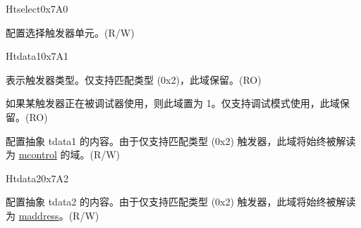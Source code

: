 \begin{register}{H}{tselect}{0x7A0}\label{regdesc:LPTSELECT}
%
\regnewline%
\begin{regdesc}\begin{reglist}
\label{fielddesc:LPTSELECT}\item [tselect] 配置选择触发器单元。(R/W)
\end{reglist}\end{regdesc}
\end{register}

\begin{register}{H}{tdata1}{0x7A1}\label{regdesc:LPTDATA1}
%
%
%
\regnewline%
\begin{regdesc}\begin{reglist}
\label{fielddesc:LPTDATA1TYPE}\item [type] 表示触发器类型。仅支持匹配类型 (0x2)，此域保留。(RO)
\label{fielddesc:LPTDATA1DMODE}\item [dmode] 如果某触发器正在被调试器使用，则此域置为 1。仅支持调试模式使用，此域保留。(RO)
\label{fielddesc:LPTDATA1DATA}\item [data] 配置抽象 tdata1 的内容。由于仅支持匹配类型 (0x2) 触发器，此域将始终被解读为 \hyperref[regdesc:LPMCONTROL]{mcontrol} 的域。(R/W)
\end{reglist}\end{regdesc}
\end{register}


\begin{register}{H}{tdata2}{0x7A2}\label{regdesc:LPTDATA2}
%
\regnewline%
\begin{regdesc}\begin{reglist}
\label{fielddesc:LPTDATA2}\item [tdata2] 配置抽象 tdata2 的内容。由于仅支持匹配类型 (0x2) 触发器，此域将始终被解读为 \hyperref[regdesc:LPMADDRESS]{maddress}。(R/W)
\end{reglist}\end{regdesc}
\end{register}


